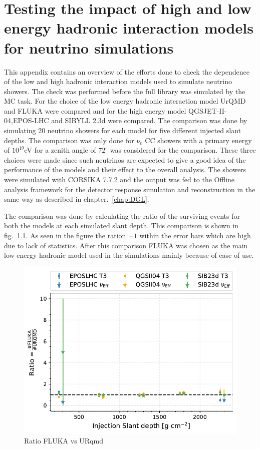 \chapter{Testing the impact of high and low energy hadronic interaction models for neutrino simulations}
\label{sec:app_2}
This appendix contains an overview of the efforts done to check the dependence of the low and high hadronic interaction models used to simulate neutrino showers. The check was performed before the full library was simulated by the MC task. For the choice of the low energy hadronic interaction model UrQMD and FLUKA were compared and for the high energy model QGSJET-II-04,EPOS-LHC and SIBYLL 2.3d  were compared. The comparison was done by simulating 20 neutrino showers for each model for five different injected slant depths. The comparison was only done for $\nu_e$ CC showers with a primary energy of $10^{19}$eV for a zenith angle of $72^\circ$ was considered for the comparison. These three choices were made since such neutrinos are expected to give a good idea of the performance of the models and their effect to the overall analysis. The showers were simulated with CORSIKA 7.7.2 and the output was fed to the Offline analysis framework for the detector response simulation and reconstruction in the same way as described in chapter.~\ref{chap:DGL}. 

The comparison was done by calculating the ratio of the surviving events for both the models at each simulated slant depth. This comparison is shown in fig.~\ref{fig:Efficiency_vs_slant_comp_FLUKAnURQMD}. As seen in the figure the ration $\sim 1$ within the error bars which are high due to lack of statistics. After this comparison FLUKA was chosen as the main low energy hadronic model used in the simulations mainly because of ease of use. 

\begin{figure}[t!]
  \centering
  \includegraphics[width=\textwidth]{thesis_figures/App2/Efficiency_vs_slant_comp_FLUKAnURQMD.pdf}
  \caption{Ratio FLUKA vs URqmd}
  \label{fig:Efficiency_vs_slant_comp_FLUKAnURQMD}
\end{figure}

